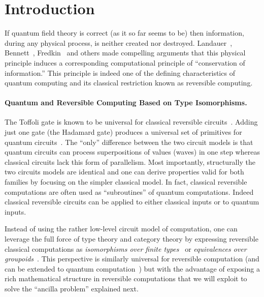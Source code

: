 \documentclass[sigplan,10pt,review,anonymous]{acmart}
\begin{document}






\section{Introduction}

If quantum field theory is correct (as it so far seems to be) then
information, during any physical process, is neither created nor
destroyed. Landauer~\cite{Landauer:1961,Landauer,bennett1985fundamental},
Bennett~\cite{bennett2010notes,bennett2003notes,Bennett:1973:LRC},
Fredkin~\cite{fredkin1982conservative} and others made compelling
arguments that this physical principle induces a corresponding
computational principle of ``conservation of information.'' This
principle is indeed one of the defining characteristics of quantum
computing and its classical restriction known as reversible computing.

\paragraph*{Quantum and Reversible Computing Based on Type
  Isomorphisms.} The Toffoli gate is known to be universal for
classical reversible circuits~\cite{Toffoli:1980}. Adding just one
gate (the Hadamard gate) produces a universal set of primitives for
quantum circuits~\cite{hadtoffuniv}. The ``only'' difference between
the two circuit models is that quantum circuits can process
superpositions of values (waves) in one step whereas classical
circuits lack this form of parallelism. Most importantly, structurally
the two circuits models are identical and one can derive properties
valid for both families by focusing on the simpler classical model. In
fact, classical reversible computations are often used as
``subroutines'' of quantum computations. Indeed classical reversible
circuits can be applied to either classical inputs or to quantum
inputs. 

Instead of using the rather low-level circuit model of computation,
one can leverage the full force of type theory and category theory by
expressing reversible classical computations as \emph{isomorphisms
  over finite types}~\cite{Fiore:2004,James:2012:IE:2103656.2103667}
or \emph{equivalences over
  groupoids}~\cite{DBLP:conf/esop/CaretteS16}. This perspective is
similarly universal for reversible computation (and can be extended to
quantum computation~\cite{10.1007/978-3-319-89366-2_19}) but with the
advantage of exposing a rich mathematical structure in reversible
computations that we will exploit to solve the ``ancilla problem''
explained next.
\end{document}

